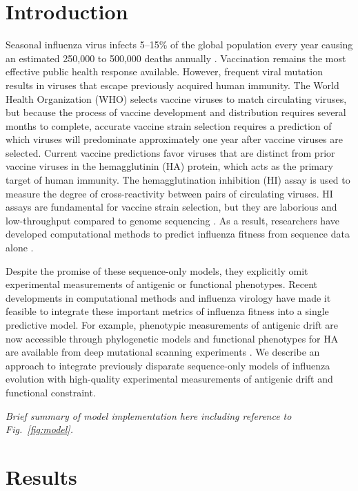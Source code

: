 
\section*{Introduction}

Seasonal influenza virus infects 5--15\% of the global population every year causing an estimated 250,000 to 500,000 deaths annually \cite{flufactsheet}.
Vaccination remains the most effective public health response available.
However, frequent viral mutation results in viruses that escape previously acquired human immunity.
The World Health Organization (WHO) selects vaccine viruses to match circulating viruses, but because the process of vaccine development and distribution requires several months to complete, accurate vaccine strain selection requires a prediction of which viruses will predominate approximately one year after vaccine viruses are selected.
Current vaccine predictions favor viruses that are distinct from prior vaccine viruses in the hemagglutinin (HA) protein, which acts as the primary target of human immunity.
The hemagglutination inhibition (HI) assay \cite{hirst1943studies} is used to measure the degree of cross-reactivity between pairs of circulating viruses.
HI assays are fundamental for vaccine strain selection, but they are laborious and low-throughput compared to genome sequencing \cite{Wood:2012ii}.
As a result, researchers have developed computational methods to predict influenza fitness from sequence data alone \cite{Luksza:2014hj,Steinbruck:2014kq,Neher:2014eu}.

Despite the promise of these sequence-only models, they explicitly omit experimental measurements of antigenic or functional phenotypes.
Recent developments in computational methods and influenza virology have made it feasible to integrate these important metrics of influenza fitness into a single predictive model.
For example, phenotypic measurements of antigenic drift are now accessible through phylogenetic models \cite{Neher:2016hy} and functional phenotypes for HA are available from deep mutational scanning experiments \cite{Lee2018}.
We describe an approach to integrate previously disparate sequence-only models of influenza evolution with high-quality experimental measurements of antigenic drift and functional constraint.

\textit{Brief summary of model implementation here including reference to Fig.~\ref{fig:model}.}

\section*{Results}

